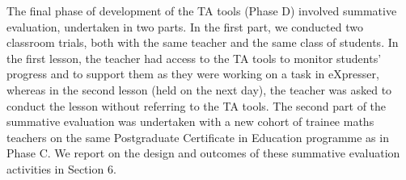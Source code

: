 The final phase of development of the TA tools (Phase D) %
involved summative evaluation, undertaken in two parts. 
In the first part, we conducted two classroom trials, both with the same teacher
and the same class of students. In the first lesson, the teacher had access
to the TA tools to monitor students' progress and to support them 
as they were working on a task in eXpresser, whereas in the second lesson 
(held on the next day), the teacher was asked to conduct the lesson without 
referring to the TA tools. 
%
The second part of the summative evaluation was undertaken with a 
new cohort of trainee maths teachers on the same Postgraduate 
Certificate in Education programme as in Phase C.  
We report on the design and outcomes of these summative evaluation
activities in Section 6.

 

